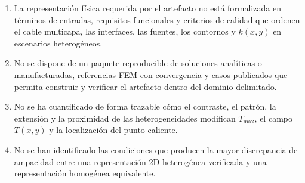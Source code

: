 \documentclass[11pt,a4paper,oneside]{report}
\newcommand{\Tmax}{T_{\max}}
\newcommand{\kx}{k(x,y)}
\begin{document}
\begin{enumerate}[label=PE\arabic*.]
  \item La representación física requerida por el artefacto no está formalizada en términos de entradas, requisitos funcionales y criterios de calidad que ordenen el cable multicapa, las interfaces, las fuentes, los contornos y $\kx$ en escenarios heterogéneos.
  \item No se dispone de un paquete reproducible de soluciones analíticas o manufacturadas, referencias FEM con convergencia y casos publicados que permita construir y verificar el artefacto dentro del dominio delimitado.
  \item No se ha cuantificado de forma trazable cómo el contraste, el patrón, la extensión y la proximidad de las heterogeneidades modifican $\Tmax$, el campo $T(x,y)$ y la localización del punto caliente.
  \item No se han identificado las condiciones que producen la mayor discrepancia de ampacidad entre una representación 2D heterogénea verificada y una representación homogénea equivalente.
\end{enumerate}
\end{document}
